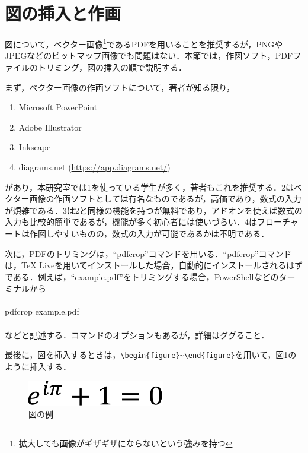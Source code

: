 \documentclass[11pt,a4paper]{jsarticle}
\begin{document}
\section{図の挿入と作画}

図について，ベクター画像\footnote{拡大しても画像がギザギザにならないという強みを持つ}であるPDFを用いることを推奨するが，PNGやJPEGなどのビットマップ画像でも問題はない．本節では，作図ソフト，PDFファイルのトリミング，図の挿入の順で説明する．

まず，ベクター画像の作画ソフトについて，著者が知る限り，
\begin{enumerate} %
  \item Microsoft PowerPoint
  \item Adobe Illustrator
  \item Inkscape
  \item diagrams.net (\url{https://app.diagrams.net/})
\end{enumerate}
があり，本研究室では1を使っている学生が多く，著者もこれを推奨する．2はベクター画像の作画ソフトとしては有名なものであるが，高価であり，数式の入力が煩雑である．3は2と同様の機能を持つが無料であり，アドオンを使えば数式の入力も比較的簡単であるが，機能が多く初心者には使いづらい．4はフローチャートは作図しやすいものの，数式の入力が可能であるかは不明である．

次に，PDFのトリミングは，``pdfcrop''コマンドを用いる．``pdfcrop''コマンドは，TeX Liveを用いてインストールした場合，自動的にインストールされるはずである．例えば，``example.pdf''をトリミングする場合，PowerShellなどのターミナルから
\\\hrulefill\\
pdfcrop example.pdf\\
\hrulefill\\
などと記述する．コマンドのオプションもあるが，詳細はググること．

最後に，図を挿入するときは，\verb|\begin{figure}~\end{figure}|を用いて，図\ref{fig:example-image}のように挿入する．

\begin{figure}[hbtp]
  \centering %
  \includegraphics[width=6cm]{example-crop.pdf} %
  \caption{図の例} %
  \label{fig:example-image} %
\end{figure}
\end{document}
